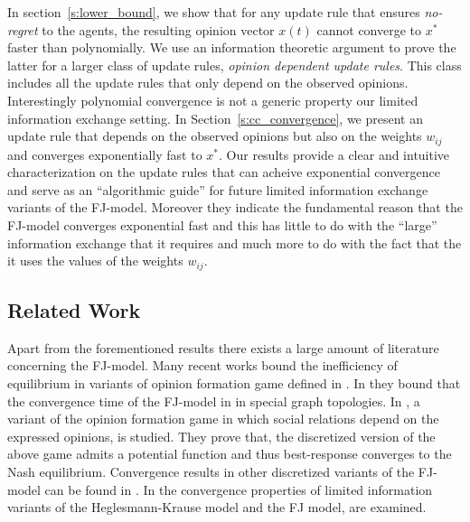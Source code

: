 In section~\ref{s:lower_bound}, we show
that for any update rule that ensures \emph{no-regret}
to the agents, the resulting opinion vector $x(t)$
cannot converge to $x^*$ faster than polynomially. 
We use an information theoretic argument to prove
the latter for a larger class of update rules,
\emph{opinion dependent update rules}. This class includes
all the update rules that only depend on the observed
opinions. Interestingly polynomial convergence is not a 
generic property our limited information exchange setting.
In Section~\ref{s:cc_convergence}, we present an update rule 
that depends on the observed opinions but also on the weights
$w_{ij}$ and converges exponentially fast to $x^*$. Our results
provide a clear and intuitive characterization on the update 
rules that can acheive exponential convergence and serve as 
an \enquote{algorithmic guide} for future limited information exchange
variants of the FJ-model. Moreover they indicate the fundamental reason that
the FJ-model converges exponential fast and this has little
to do with the \enquote{large} information exchange 
that it requires and much more to do with the fact that 
the it uses the values of the weights $w_{ij}$.

\subsection{Related Work}
Apart from the forementioned results there exists a large amount
of literature concerning the FJ-model.
Many recent works \cite{BGM13,CKO13,BFM16,EFHS17} bound the
inefficiency of equilibrium in variants of opinion formation game
defined in \cite{BKO11}. In \cite{GS14} they bound that the convergence
time of the FJ-model in in special graph topologies.
In \cite{BFM16}, a variant of the opinion formation game in which social
relations depend on the expressed opinions, is studied.
They prove that, the discretized version of the above game admits
a potential function and thus best-response converges to the
Nash equilibrium. Convergence results in other discretized variants of
the FJ-model can be found in \cite{YOASS13,FGV16}. In \cite{FPS16} the convergence
properties of limited information variants of the Heglesmann-Krause model \cite{HK}
and the FJ model, are examined.


